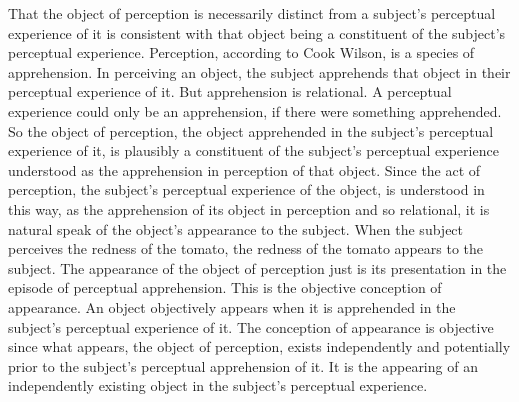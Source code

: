 \documentclass[12pt]{article}
\begin{document}
That the object of perception is necessarily distinct from a subject's perceptual experience of it is consistent with that object being a constituent of the subject's perceptual experience. Perception, according to Cook Wilson, is a species of apprehension. In perceiving an object, the subject apprehends that object in their perceptual experience of it. But apprehension is relational. A perceptual experience could only be an apprehension, if there were something apprehended. So the object of perception, the object apprehended in the subject's perceptual experience of it, is plausibly a constituent of the subject's perceptual experience understood as the apprehension in perception of that object. Since the act of perception, the subject's perceptual experience of the object, is understood in this way, as the apprehension of its object in perception and so relational, it is natural speak of the object's appearance to the subject. When the subject perceives the redness of the tomato, the redness of the tomato appears to the subject. The appearance of the object of perception just is its presentation in the episode of perceptual apprehension. This is the objective conception of appearance. An object objectively appears when it is apprehended in the subject's perceptual experience of it. The conception of appearance is objective since what appears, the object of perception, exists independently and potentially prior to the subject's perceptual apprehension of it. It is the appearing of an independently existing object in the subject's perceptual experience.
\end{document}
